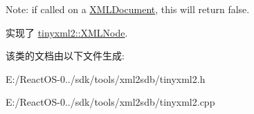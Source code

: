 Note\+: if called on a \hyperlink{classtinyxml2_1_1_x_m_l_document}{X\+M\+L\+Document}, this will return false. 

实现了 \hyperlink{classtinyxml2_1_1_x_m_l_node_a7ce18b751c3ea09eac292dca264f9226}{tinyxml2\+::\+X\+M\+L\+Node}.



该类的文档由以下文件生成\+:\begin{DoxyCompactItemize}
\item 
E\+:/\+React\+O\+S-\/0../sdk/tools/xml2sdb/tinyxml2.\+h\item 
E\+:/\+React\+O\+S-\/0../sdk/tools/xml2sdb/tinyxml2.\+cpp\end{DoxyCompactItemize}
